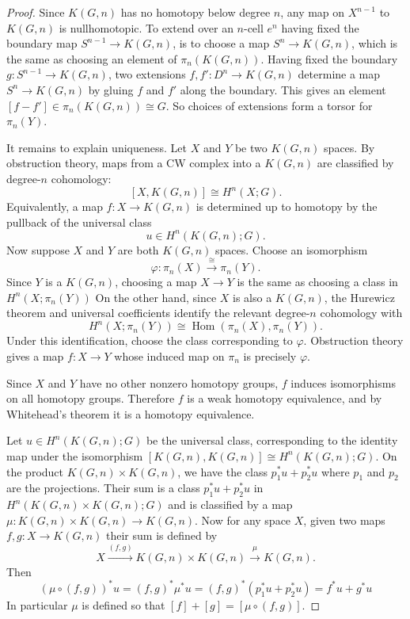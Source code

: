 \documentclass[12pt]{article}
\begin{document}
\begin{proof}
    Since $K(G,n)$ has no homotopy below degree $n$, any map on $X^{n-1}$ to $K(G,n)$ is nullhomotopic. To extend over an $n$-cell $e^n$ having fixed the boundary map $S^{n-1} \to K(G,n)$, is to choose a map $S^n \to K(G,n)$, which is the same as choosing an element of $\pi_n(K(G,n))$. Having fixed the boundary $g:S^{n-1} \to K(G,n)$, two extensions $f,f':D^n \to K(G,n)$ determine a map $S^n \to K(G,n)$ by gluing $f$ and $f'$ along the boundary. This gives an element $[f-f']\in \pi_n(K(G,n))\cong G$. So choices of extensions form a torsor for $\pi_n(Y)$.

It remains to explain uniqueness. Let $X$ and $Y$ be two $K(G,n)$ spaces. By obstruction theory, maps from a CW complex into a $K(G,n)$ are classified by degree-$n$ cohomology:
\[
[X,K(G,n)]\cong H^n(X;G).
\]
Equivalently, a map $f:X\to K(G,n)$ is determined up to homotopy by the pullback of the universal class
\[
u\in H^n(K(G,n);G).
\]
Now suppose $X$ and $Y$ are both $K(G,n)$ spaces. Choose an isomorphism
\[
\varphi:\pi_n(X)\xrightarrow{\cong}\pi_n(Y).
\]
Since $Y$ is a $K(G,n)$, choosing a map $X\to Y$ is the same as choosing a class in $H^n(X;\pi_n(Y))$
On the other hand, since $X$ is also a $K(G,n)$, the Hurewicz theorem and universal coefficients identify the relevant degree-$n$ cohomology with
\[
H^n(X;\pi_n(Y))\cong \operatorname{Hom}(\pi_n(X),\pi_n(Y)).
\]
Under this identification, choose the class corresponding to $\varphi$. Obstruction theory gives a map $f:X\to Y$
whose induced map on $\pi_n$ is precisely $\varphi$.

Since $X$ and $Y$ have no other nonzero homotopy groups, $f$ induces isomorphisms on all homotopy groups. Therefore $f$ is a weak homotopy equivalence, and by Whitehead's theorem it is a homotopy equivalence.

Let $u\in H^n(K(G,n);G)$ be the universal class, corresponding to the identity map under the isomorphism $[K(G,n),K(G,n)]\cong H^n(K(G,n);G)$. On the product $K(G,n)\times K(G,n)$, we have the class $p_1^*u + p_2^*u$ where $p_1$ and $p_2$ are the projections. Their sum is a class $p_1^*u + p_2^*u$ in $H^n(K(G,n)\times K(G,n);G)$ and is classified by a map $\mu: K(G,n)\times K(G,n) \to K(G,n)$. Now for any space $X$, given two maps $f,g:X\to K(G,n)$ their sum is defined by
\[
X\xrightarrow{(f,g)}K(G,n)\times K(G,n)
\xrightarrow{\mu}K(G,n).
\]
Then
\[(\mu\circ(f,g))^*u
=
(f,g)^*\mu^*u
=
(f,g)^*(p_1^*u+p_2^*u)
=
f^*u+g^*u\]
In particular $\mu$ is defined so that $[f]+[g]
=[\mu\circ(f,g)]$. \qedhere
\end{proof}
\end{document}
